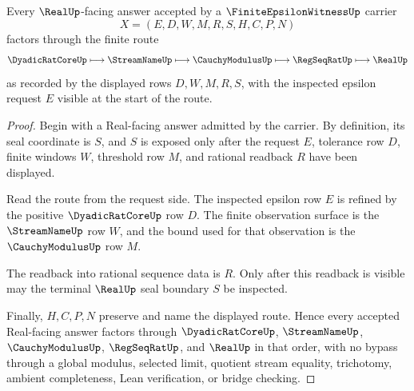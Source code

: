 \begin{theorem}
\label{thm:finite-epsilon-witness-real-route}
Every $\RealUp$-facing answer accepted by a $\FiniteEpsilonWitnessUp$ carrier
$$
X=(E,D,W,M,R,S,H,C,P,N)
$$
factors through the finite route
$$
\DyadicRatCoreUp \longmapsto \StreamNameUp \longmapsto \CauchyModulusUp \longmapsto \RegSeqRatUp \longmapsto \RealUp
$$
as recorded by the displayed rows $D,W,M,R,S$, with the inspected epsilon request $E$ visible at the start of the route.
\end{theorem}
\begin{proof}
Begin with a Real-facing answer admitted by the carrier. By definition, its seal coordinate is $S$, and $S$ is exposed only after the request $E$, tolerance row $D$, finite windows $W$, threshold row $M$, and rational readback $R$ have been displayed.

Read the route from the request side. The inspected epsilon row $E$ is refined by the positive $\DyadicRatCoreUp$ row $D$. The finite observation surface is the $\StreamNameUp$ row $W$, and the bound used for that observation is the $\CauchyModulusUp$ row $M$.

The readback into rational sequence data is $R$. Only after this readback is visible may the terminal $\RealUp$ seal boundary $S$ be inspected.

Finally, $H,C,P,N$ preserve and name the displayed route. Hence every accepted Real-facing answer factors through $\DyadicRatCoreUp$, $\StreamNameUp$, $\CauchyModulusUp$, $\RegSeqRatUp$, and $\RealUp$ in that order, with no bypass through a global modulus, selected limit, quotient stream equality, trichotomy, ambient completeness, Lean verification, or bridge checking.
\end{proof}


\begin{closurestatus}{\FiniteEpsilonWitnessUp}
  \theoryclosure{\seedClosure}
  \formalstatus{\theoremCheckedV}
\end{closurestatus}
